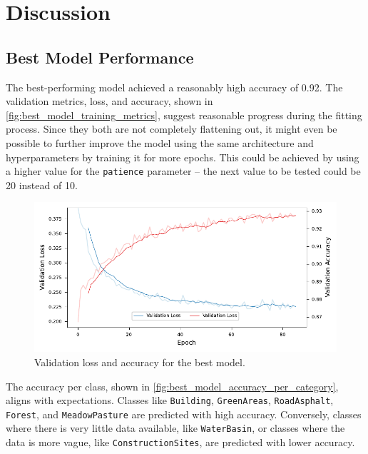 


\section{Discussion}
\label{discussion}

\subsection{Best Model Performance}

The best-performing model achieved a reasonably high accuracy of 0.92. The validation
metrics, loss, and accuracy, shown in \autoref{fig:best_model_training_metrics},
suggest reasonable progress during the fitting process. Since they both are not
completely flattening out, it might even be possible to further improve the model
using the same architecture and hyperparameters by training it for more epochs.
This could be achieved by using a higher value for the \texttt{patience} parameter --
the next value to be tested could be 20 instead of 10.

\begin{figure}[H]
    \centering
    \captionsetup{width=0.8\linewidth}
    \includegraphics{figures/best_model_training_metrics.pdf}
    \caption{Validation loss and accuracy for the best model.}
    \label{fig:best_model_training_metrics}
\end{figure}

The accuracy per class, shown in \autoref{fig:best_model_accuracy_per_category},
aligns with expectations. Classes like \texttt{Building}, \texttt{GreenAreas}, \texttt{RoadAsphalt}, \texttt{Forest},
and \texttt{MeadowPasture} are predicted with high accuracy. Conversely, classes where there is
very little data available, like \texttt{WaterBasin}, or classes where the data is more vague,
like \texttt{ConstructionSites}, are predicted with lower accuracy.

